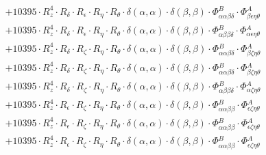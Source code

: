 \documentclass{article}
\begin{document}
\begin{subequations}
\begin{gather}
\begin{array}{c}
 \\[0.2em] 		 + 10395 \cdot R_{z}^{4} \cdot R_{\delta{}} \cdot R_{\epsilon{}} \cdot R_{\eta{}} \cdot R_{\theta{}} \cdot \delta{}\left(\alpha{}, \alpha{}\right) \cdot \delta{}\left(\beta{}, \beta{}\right) \cdot \Phi{}^{B}_{\alpha{}\alpha{}\beta{}\delta{}} \cdot \Phi{}^{A}_{\beta{}\epsilon{}\eta{}\theta{}} 
 \\[0.2em] 		 + 10395 \cdot R_{z}^{4} \cdot R_{\delta{}} \cdot R_{\epsilon{}} \cdot R_{\eta{}} \cdot R_{\theta{}} \cdot \delta{}\left(\alpha{}, \alpha{}\right) \cdot \delta{}\left(\beta{}, \beta{}\right) \cdot \Phi{}^{B}_{\alpha{}\beta{}\beta{}\delta{}} \cdot \Phi{}^{A}_{\alpha{}\epsilon{}\eta{}\theta{}} 
 \\[0.2em] 		 + 10395 \cdot R_{z}^{4} \cdot R_{\delta{}} \cdot R_{\zeta{}} \cdot R_{\eta{}} \cdot R_{\theta{}} \cdot \delta{}\left(\alpha{}, \alpha{}\right) \cdot \delta{}\left(\beta{}, \beta{}\right) \cdot \Phi{}^{B}_{\alpha{}\alpha{}\beta{}\delta{}} \cdot \Phi{}^{A}_{\beta{}\zeta{}\eta{}\theta{}} 
 \\[0.2em] 		 + 10395 \cdot R_{z}^{4} \cdot R_{\delta{}} \cdot R_{\zeta{}} \cdot R_{\eta{}} \cdot R_{\theta{}} \cdot \delta{}\left(\alpha{}, \alpha{}\right) \cdot \delta{}\left(\beta{}, \beta{}\right) \cdot \Phi{}^{B}_{\alpha{}\alpha{}\beta{}\delta{}} \cdot \Phi{}^{A}_{\beta{}\zeta{}\eta{}\theta{}} 
 \\[0.2em] 		 + 10395 \cdot R_{z}^{4} \cdot R_{\delta{}} \cdot R_{\zeta{}} \cdot R_{\eta{}} \cdot R_{\theta{}} \cdot \delta{}\left(\alpha{}, \alpha{}\right) \cdot \delta{}\left(\beta{}, \beta{}\right) \cdot \Phi{}^{B}_{\alpha{}\beta{}\beta{}\delta{}} \cdot \Phi{}^{A}_{\alpha{}\zeta{}\eta{}\theta{}} 
 \\[0.2em] 		 + 10395 \cdot R_{z}^{4} \cdot R_{\epsilon{}} \cdot R_{\zeta{}} \cdot R_{\eta{}} \cdot R_{\theta{}} \cdot \delta{}\left(\alpha{}, \alpha{}\right) \cdot \delta{}\left(\beta{}, \beta{}\right) \cdot \Phi{}^{B}_{\alpha{}\alpha{}\beta{}\beta{}} \cdot \Phi{}^{A}_{\epsilon{}\zeta{}\eta{}\theta{}} 
 \\[0.2em] 		 + 10395 \cdot R_{z}^{4} \cdot R_{\epsilon{}} \cdot R_{\zeta{}} \cdot R_{\eta{}} \cdot R_{\theta{}} \cdot \delta{}\left(\alpha{}, \alpha{}\right) \cdot \delta{}\left(\beta{}, \beta{}\right) \cdot \Phi{}^{B}_{\alpha{}\alpha{}\beta{}\beta{}} \cdot \Phi{}^{A}_{\epsilon{}\zeta{}\eta{}\theta{}} 
 \\[0.2em] 		 + 10395 \cdot R_{z}^{4} \cdot R_{\epsilon{}} \cdot R_{\zeta{}} \cdot R_{\eta{}} \cdot R_{\theta{}} \cdot \delta{}\left(\alpha{}, \alpha{}\right) \cdot \delta{}\left(\beta{}, \beta{}\right) \cdot \Phi{}^{B}_{\alpha{}\alpha{}\beta{}\beta{}} \cdot \Phi{}^{A}_{\epsilon{}\zeta{}\eta{}\theta{}} 

\end{array}
\end{gather}
\end{subequations}
\end{document}
